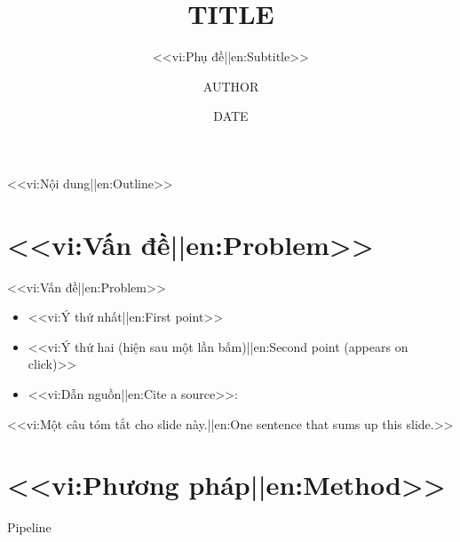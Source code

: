 \documentclass[aspectratio=169,11pt]{beamer}
\title{{{TITLE}}}
\subtitle{<<vi:Phụ đề||en:Subtitle>>}
\author{{{AUTHOR}}}
\date{{{DATE}}}
\begin{document}
\begin{frame}
  \titlepage
\end{frame}

\begin{frame}{<<vi:Nội dung||en:Outline>>}
  \tableofcontents
\end{frame}

\section{<<vi:Vấn đề||en:Problem>>}
\begin{frame}{<<vi:Vấn đề||en:Problem>>}
  \begin{itemize}
    \item<1-> <<vi:Ý thứ nhất||en:First point>>
    \item<2-> <<vi:Ý thứ hai (hiện sau một lần bấm)||en:Second point (appears on click)>>
    \item<3-> <<vi:Dẫn nguồn||en:Cite a source>>: \citet{kerbl2023gaussian}
  \end{itemize}
  \begin{keyidea}
    <<vi:Một câu tóm tắt cho slide này.||en:One sentence that sums up this slide.>>
  \end{keyidea}
\end{frame}

\section{<<vi:Phương pháp||en:Method>>}
\begin{frame}{Pipeline}
  \centering
  \vspace{1em}

\end{frame}

\end{document}
